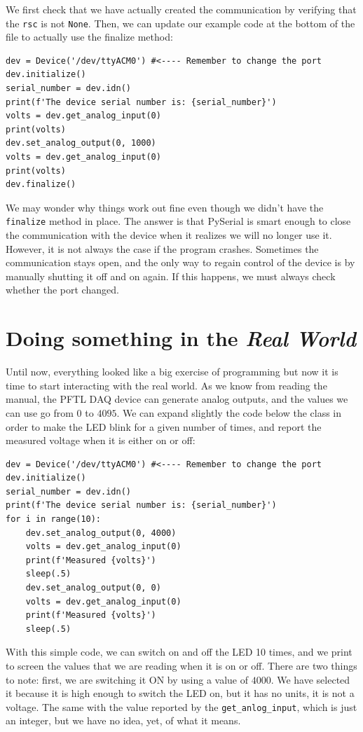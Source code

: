 We first check that we have actually created the communication by verifying that the \texttt{rsc} is not \texttt{None}. Then, we can update our example code at the bottom of the file to actually use the finalize method:

\begin{verbatim}
dev = Device('/dev/ttyACM0') #<---- Remember to change the port
dev.initialize()
serial_number = dev.idn()
print(f'The device serial number is: {serial_number}')
volts = dev.get_analog_input(0)
print(volts)
dev.set_analog_output(0, 1000)
volts = dev.get_analog_input(0)
print(volts)
dev.finalize()
\end{verbatim}

We may wonder why things work out fine even though we didn't have the \texttt{finalize} method in place. The answer is that PySerial is smart enough to close the communication with the device when it realizes we will no longer use it. However, it is not always the case if the program crashes. Sometimes the communication stays open, and the only way to regain control of the device is by manually shutting it off and on again. If this happens, we must always check whether the port changed.

\section{Doing something in the \emph{Real World}}\label{sec:doing-something-in-theemph}
Until now, everything looked like a big exercise of programming but now it is time to start interacting with the real world. As we know from reading the manual, the {PFTL DAQ} device can generate analog outputs, and the values we can use go from $0$ to $4095$. We can expand slightly the code below the class in order to make the LED blink for a given number of times, and report the measured voltage when it is either on or off:

\begin{verbatim}
dev = Device('/dev/ttyACM0') #<---- Remember to change the port
dev.initialize()
serial_number = dev.idn()
print(f'The device serial number is: {serial_number}')
for i in range(10):
    dev.set_analog_output(0, 4000)
    volts = dev.get_analog_input(0)
    print(f'Measured {volts}')
    sleep(.5)
    dev.set_analog_output(0, 0)
    volts = dev.get_analog_input(0)
    print(f'Measured {volts}')
    sleep(.5)
\end{verbatim}

With this simple code, we can switch on and off the LED 10 times, and we print to screen the values that we are reading when it is on or off. There are two things to note: first, we are switching it ON by using a value of $4000$. We have selected it because it is high enough to switch the LED on, but it has no units, it is not a voltage. The same with the value reported by the \texttt{get\_anlog\_input}, which is just an integer, but we have no idea, yet, of what it means.

